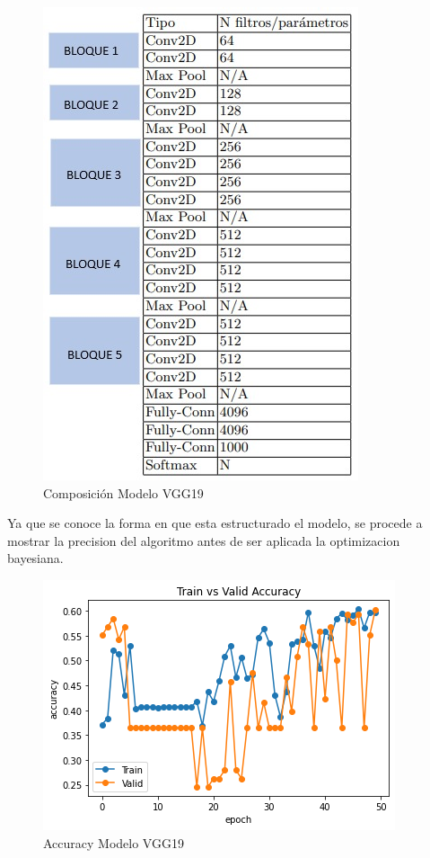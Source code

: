 				\begin{figure}[ht]
					\centering
					\includegraphics[scale=0.55]{Figs/21.jpeg}
					\caption{Composición Modelo VGG19}
					\label{fig:VGG19_tabla}
				\end{figure}
			
				Ya que se conoce la forma en que esta estructurado el modelo, se procede a mostrar la precision del algoritmo antes de ser aplicada la optimizacion bayesiana.
				
				\begin{figure}[ht]
					\centering
					\includegraphics[scale=0.55]{Figs/101.png}
					\caption{Accuracy Modelo VGG19}
					\label{fig:VGG19_accuracy}
				\end{figure}  
				
